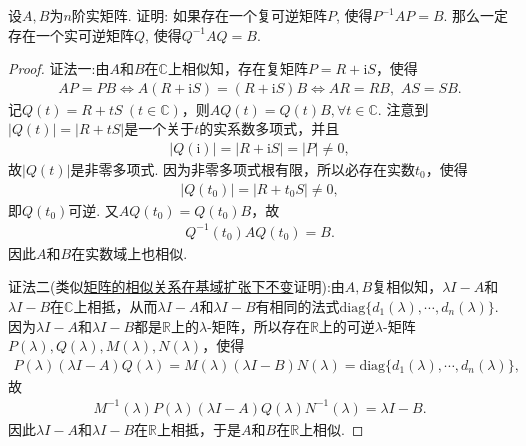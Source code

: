 \documentclass[../../main.tex]{subfiles}%
\begin{document}
\begin{example}
设$A,B$为$n$阶实矩阵. 证明: 如果存在一个复可逆矩阵$P$, 使得$P^{-1}AP = B$. 那么一定存在一个实可逆矩阵$Q$, 使得$Q^{-1}AQ = B$.
\end{example}
\begin{proof}

{\color{blue}证法一:}由$A$和$B$在$\mathbb{C}$上相似知，存在复矩阵$P=R+\mathrm{i}S$，使得
\begin{align*}
AP=PB\Longleftrightarrow A(R+\mathrm{i}S)=(R+\mathrm{i}S)B\Longleftrightarrow AR=RB,\,\,AS=SB.
\end{align*}
记$Q(t)=R+tS\ (t\in\mathbb{C})$，则$AQ(t)=Q(t)B,\forall t\in\mathbb{C}$. 注意到$|Q(t)|=|R+tS|$是一个关于$t$的实系数多项式，并且
\begin{align*}
|Q(\mathrm{i})|=|R+\mathrm{i}S|=|P|\ne 0,
\end{align*}
故$|Q(t)|$是非零多项式. 因为非零多项式根有限，所以必存在实数$t_0$，使得
\begin{align*}
|Q(t_0)|=|R+t_0S|\ne 0,
\end{align*}
即$Q(t_0)$可逆. 又$AQ(t_0)=Q(t_0)B$，故
\begin{align*}
Q^{-1}(t_0)AQ(t_0)=B.
\end{align*}
因此$A$和$B$在实数域上也相似.

{\color{blue}证法二(类似\hyperref[corollary:矩阵的相似关系在基域扩张下不变]{矩阵的相似关系在基域扩张下不变}证明):}由$A,B$复相似知，$\lambda I-A$和$\lambda I-B$在$\mathbb{C}$上相抵，从而$\lambda I-A$和$\lambda I-B$有相同的法式$\mathrm{diag}\{d_1(\lambda),\cdots,d_n(\lambda)\}$. 因为$\lambda I-A$和$\lambda I-B$都是$\mathbb{R}$上的$\lambda$-矩阵，所以存在$\mathbb{R}$上的可逆$\lambda$-矩阵$P(\lambda),Q(\lambda),M(\lambda),N(\lambda)$，使得
\begin{align*}
P(\lambda)(\lambda I-A)Q(\lambda)=M(\lambda)(\lambda I-B)N(\lambda)=\mathrm{diag}\{d_1(\lambda),\cdots,d_n(\lambda)\},
\end{align*}
故
\begin{align*}
M^{-1}(\lambda)P(\lambda)(\lambda I-A)Q(\lambda)N^{-1}(\lambda)=\lambda I-B.
\end{align*}
因此$\lambda I-A$和$\lambda I-B$在$\mathbb{R}$上相抵，于是$A$和$B$在$\mathbb{R}$上相似.

\end{proof}
\end{document}

